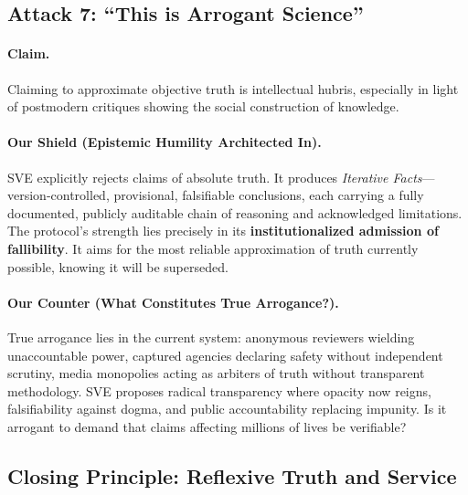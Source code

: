 \documentclass[11pt,a4paper]{article}
\theoremstyle{definition}
\theoremstyle{remark}
\begin{document}
\begin{small}
\begin{enumerate}
\begin{protocol}
\vspace{1em}

\subsection*{\textcolor{accentcolor}{Attack 7: ``This is Arrogant Science''}}

\paragraph{\textbf{Claim.}} Claiming to approximate objective truth is intellectual hubris, especially in light of postmodern critiques showing the social construction of knowledge.

\paragraph{\textbf{Our Shield (Epistemic Humility Architected In).}} SVE explicitly rejects claims of absolute truth. It produces \textit{Iterative Facts}—version-controlled, provisional, falsifiable conclusions, each carrying a fully documented, publicly auditable chain of reasoning and acknowledged limitations. The protocol's strength lies precisely in its \textbf{institutionalized admission of fallibility}. It aims for the most reliable approximation of truth currently possible, knowing it will be superseded.

\paragraph{\textbf{Our Counter (What Constitutes True Arrogance?).}} True arrogance lies in the current system: anonymous reviewers wielding unaccountable power, captured agencies declaring safety without independent scrutiny, media monopolies acting as arbiters of truth without transparent methodology. SVE proposes radical transparency where opacity now reigns, falsifiability against dogma, and public accountability replacing impunity. Is it arrogant to demand that claims affecting millions of lives be verifiable?

\vspace{1.5em}

\subsection*{\textcolor{headercolor}{Closing Principle: Reflexive Truth and Service}}


\end{protocol}
\end{enumerate}
\end{small}
\end{document}
